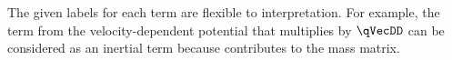 \documentclass[11pt]{article}
\newcommand{\pD}[2]{
    \frac{\partial\mspace{1mu}#1}{\partial\mspace{1mu}#2}
}
\begin{document}
The given labels for each term are flexible to interpretation. For example, the term from the velocity-dependent potential that multiplies by $\qVecDD$ can be considered as an inertial term because contributes to the mass matrix.





\end{document}
